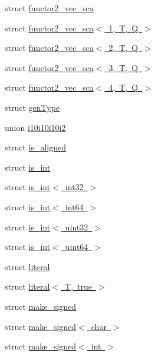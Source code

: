 \begin{DoxyCompactItemize}
\item 
struct \mbox{\hyperlink{structglm_1_1detail_1_1functor2__vec__sca}{functor2\+\_\+vec\+\_\+sca}}
\item 
struct \mbox{\hyperlink{structglm_1_1detail_1_1functor2__vec__sca_3_011_00_01_t_00_01_q_01_4}{functor2\+\_\+vec\+\_\+sca$<$ 1, T, Q $>$}}
\item 
struct \mbox{\hyperlink{structglm_1_1detail_1_1functor2__vec__sca_3_012_00_01_t_00_01_q_01_4}{functor2\+\_\+vec\+\_\+sca$<$ 2, T, Q $>$}}
\item 
struct \mbox{\hyperlink{structglm_1_1detail_1_1functor2__vec__sca_3_013_00_01_t_00_01_q_01_4}{functor2\+\_\+vec\+\_\+sca$<$ 3, T, Q $>$}}
\item 
struct \mbox{\hyperlink{structglm_1_1detail_1_1functor2__vec__sca_3_014_00_01_t_00_01_q_01_4}{functor2\+\_\+vec\+\_\+sca$<$ 4, T, Q $>$}}
\item 
struct \mbox{\hyperlink{structglm_1_1detail_1_1gen_type}{gen\+Type}}
\item 
union \mbox{\hyperlink{unionglm_1_1detail_1_1i10i10i10i2}{i10i10i10i2}}
\item 
struct \mbox{\hyperlink{structglm_1_1detail_1_1is__aligned}{is\+\_\+aligned}}
\item 
struct \mbox{\hyperlink{structglm_1_1detail_1_1is__int}{is\+\_\+int}}
\item 
struct \mbox{\hyperlink{structglm_1_1detail_1_1is__int_3_01int32_01_4}{is\+\_\+int$<$ int32 $>$}}
\item 
struct \mbox{\hyperlink{structglm_1_1detail_1_1is__int_3_01int64_01_4}{is\+\_\+int$<$ int64 $>$}}
\item 
struct \mbox{\hyperlink{structglm_1_1detail_1_1is__int_3_01uint32_01_4}{is\+\_\+int$<$ uint32 $>$}}
\item 
struct \mbox{\hyperlink{structglm_1_1detail_1_1is__int_3_01uint64_01_4}{is\+\_\+int$<$ uint64 $>$}}
\item 
struct \mbox{\hyperlink{structglm_1_1detail_1_1literal}{literal}}
\item 
struct \mbox{\hyperlink{structglm_1_1detail_1_1literal_3_01_t_00_01true_01_4}{literal$<$ T, true $>$}}
\item 
struct \mbox{\hyperlink{structglm_1_1detail_1_1make__signed}{make\+\_\+signed}}
\item 
struct \mbox{\hyperlink{structglm_1_1detail_1_1make__signed_3_01char_01_4}{make\+\_\+signed$<$ char $>$}}
\item 
struct \mbox{\hyperlink{structglm_1_1detail_1_1make__signed_3_01int_01_4}{make\+\_\+signed$<$ int $>$}}

\end{DoxyCompactItemize}
